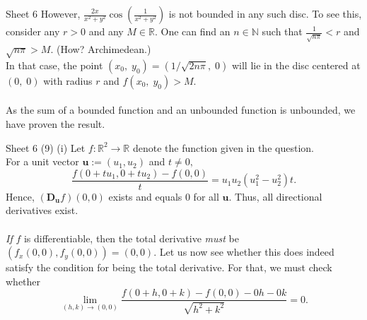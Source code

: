 \documentclass[handout, aspectratio=169]{beamer}
\begin{document}
\begin{frame}{Sheet 6}
	However, $\displaystyle\frac{2x}{x^2 + y^2}\cos\left(\frac{1}{x^2 + y^2}\right)$ is not bounded in any such disc. To see this, consider any $r > 0$ and any $M \in \mathbb{R}.$ One can find an $n \in \mathbb{N}$ such that $\frac{1}{\sqrt{n\pi}} < r$ and $\sqrt{n\pi} > M.$ \hfill (How? Archimedean.)\\
	In that case, the point $(x_0,\;y_0) = (1/\sqrt{2n\pi},\;0)$ will lie in the disc centered at $(0,\;0)$ with radius $r$ and $f(x_0,\;y_0) > M.$\\~\\
	As the sum of a bounded function and an unbounded function is unbounded, we have proven the result.
\end{frame}

\begin{frame}{Sheet 6}
	(9) (i) Let $f:\mathbb{R}^2 \to \mathbb{R}$ denote the function given in the question.\\
	For a unit vector $\textbf{u} := (u_1, u_2)$ and $t \neq 0,$
	\[\frac{f\left(0+t u_{1}, 0+t u_{2}\right)-f(0,0)}{t} = u_1u_2(u_1^2 - u_2^2)t.\]
	Hence, $\left(\mathbf{D_u} f\right)(0,0)$ exists and equals $0$ for all $\textbf{u}.$ Thus, all directional derivatives exist.\\~\\
	\emph{If} $f$ is differentiable, then the total derivative \emph{must} be $(f_x(0, 0), f_y(0, 0)) = (0, 0).$ Let us now see whether this does indeed satisfy the condition for being the total derivative. For that, we must check whether
	\[\lim _{(h, k) \rightarrow(0,0)} \frac{f\left(0+h, 0+k\right)-f\left(0, 0\right)-0 h-0 k}{\sqrt{h^{2}+k^{2}}}=0.\]
\end{frame}
\end{document}
